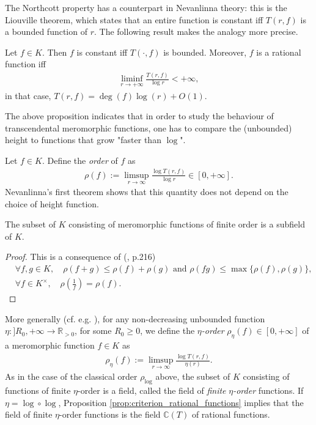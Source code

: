 \documentclass [11pt,reqno]{amsart}
\def\bC{{\mathbb{C}}}
\def\bR{{\mathbb{R}}}
\newcommand{\1}{\mathmybb{1}}
\begin{document}
The Northcott property has a counterpart in Nevanlinna theory: this is the Liouville theorem, which states that an entire function is constant iff $T(r,f)$ is a bounded function of $r$. The following result makes the analogy more precise.

\begin{proposition}
\label{prop:criterion_rational_functions}
Let $f\in K$. Then $f$ is constant iff $T(\cdot,f)$ is bounded. Moreover, $f$ is a rational function iff
\begin{align*}
\displaystyle\liminf_{r\to+\infty} \frac{T(r,f)}{\log r} < +\infty,
\end{align*}
in that case, $T(r,f)=\deg(f)\log(r) + O(1)$.
\end{proposition}

The above proposition indicates that in order to study the behaviour of transcendental meromorphic functions, one has to compare the (unbounded) height to functions that grow "faster than $\log$". 

Let $f\in K$. Define the \emph{order} of $f$ as
\begin{align*}
\rho(f):= \limsup_{r\to \infty} \frac{\log T(r,f)}{\log r} \in [0,+\infty].
\end{align*}
Nevanlinna's first theorem shows that this quantity does not depend on the choice of height function.

\begin{lemma}
The subset of $K$ consisting of meromorphic functions of finite order is a subfield of $K$.
\end{lemma}

\begin{proof}
This is a consequence of (\cite{Nevanlinna70}, p.216)
\begin{align*}
&\forall f,g\in K, \quad \rho(f+g) \leq \rho(f)+\rho(g) \text{ and }\rho(fg) \leq \max\{\rho(f),\rho(g)\},\\
&\forall f\in K^{\times}, \quad \rho\left(\frac{1}{f}\right) = \rho(f).
\end{align*}
\end{proof}

More generally (cf. e.g. \cite{Heittokangas2021}), for any non-decreasing unbounded function $\eta: ]R_{0},+\infty\to \bR_{>0}$, for some $R_{0}\geq 0$, we define the $\eta$\emph{-order} $\rho_{\eta}(f)\in [0,+\infty]$ of a meromorphic function $f\in K$ as 
\begin{align*}
\rho_{\eta}(f):= \limsup_{r\to \infty} \frac{\log T(r,f)}{\eta(r)}.
\end{align*}
As in the case of the classical order $\rho_{\log}$ above, the subset of $K$ consisting of functions of finite $\eta$-order is a field, called the field of \emph{finite} $\eta$\emph{-order} functions. If $\eta = \log\circ\log$, Proposition \ref{prop:criterion_rational_functions} implies that the field of finite $\eta$-order functions is the field $\bC(T)$ of rational functions. 
\end{document}
